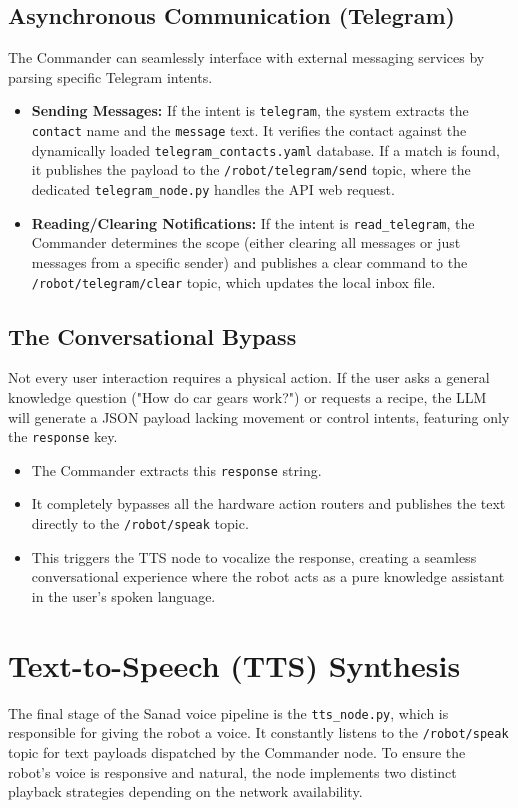 \subsection{Asynchronous Communication (Telegram)}
The Commander can seamlessly interface with external messaging services by parsing specific Telegram intents.
\begin{itemize}
    \item \textbf{Sending Messages:} If the intent is \texttt{telegram}, the system extracts the \texttt{contact} name and the \texttt{message} text. It verifies the contact against the dynamically loaded \texttt{telegram\_contacts.yaml} database. If a match is found, it publishes the payload to the \texttt{/robot/telegram/send} topic, where the dedicated \texttt{telegram\_node.py} handles the API web request.
    \item \textbf{Reading/Clearing Notifications:} If the intent is \texttt{read\_telegram}, the Commander determines the scope (either clearing all messages or just messages from a specific sender) and publishes a clear command to the \texttt{/robot/telegram/clear} topic, which updates the local inbox file.
\end{itemize}

\subsection{The Conversational Bypass}
Not every user interaction requires a physical action. If the user asks a general knowledge question ("How do car gears work?") or requests a recipe, the LLM will generate a JSON payload lacking movement or control intents, featuring only the \texttt{response} key.
\begin{itemize}
    \item The Commander extracts this \texttt{response} string.
    \item It completely bypasses all the hardware action routers and publishes the text directly to the \texttt{/robot/speak} topic.
    \item This triggers the TTS node to vocalize the response, creating a seamless conversational experience where the robot acts as a pure knowledge assistant in the user's spoken language.
\end{itemize}

\section{Text-to-Speech (TTS) Synthesis}
The final stage of the Sanad voice pipeline is the \texttt{tts\_node.py}, which is responsible for giving the robot a voice. It constantly listens to the \texttt{/robot/speak} topic for text payloads dispatched by the Commander node. To ensure the robot's voice is responsive and natural, the node implements two distinct playback strategies depending on the network availability.

